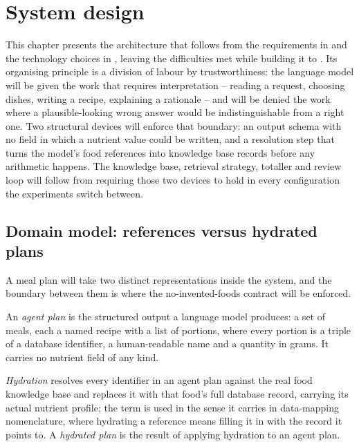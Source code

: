 \chapter{System design}
\label{cha:design}

This chapter presents the architecture that follows from the requirements in  and the technology choices in , leaving the difficulties met while building it to . Its organising principle is a division of labour by trustworthiness: the language model will be given the work that requires interpretation -- reading a request, choosing dishes, writing a recipe, explaining a rationale -- and will be denied the work where a plausible-looking wrong answer would be indistinguishable from a right one. Two structural devices will enforce that boundary: an output schema with no field in which a nutrient value could be written, and a resolution step that turns the model's food references into knowledge base records before any arithmetic happens. The knowledge base, retrieval strategy, totaller and review loop will follow from requiring those two devices to hold in every configuration the experiments switch between.

\section{Domain model: references versus hydrated plans}
\label{sec:design-domain-model}

A meal plan will take two distinct representations inside the system, and the boundary between them is where the no-invented-foods contract will be enforced.

\begin{definition}
    \label{def:agent-plan}
    An \emph{agent plan} is the structured output a language model produces: a set of meals, each a named recipe with a list of portions, where every portion is a triple of a database identifier, a human-readable name and a quantity in grams. It carries no nutrient field of any kind.
\end{definition}

\begin{definition}
    \label{def:hydrated-plan}
    \emph{Hydration} resolves every identifier in an agent plan against the real food knowledge base and replaces it with that food's full database record, carrying its actual nutrient profile; the term is used in the sense it carries in data-mapping nomenclature, where hydrating a reference means filling it in with the record it points to. A \emph{hydrated plan} is the result of applying hydration to an agent plan.
\end{definition}

